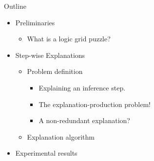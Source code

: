 \documentclass[handout]{beamer}
\begin{document}
\begin{frame}{Outline}

    \begin{itemize}
        \item Preliminaries
              \begin{itemize}
                  \item What is a logic grid puzzle?
              \end{itemize}
        \item Step-wise Explanations
              \begin{itemize}
                  \item Problem definition
                        \begin{itemize}
                            \item Explaining an inference step.
                            \item The explanation-production problem!
                            \item A non-redundant explanation?
                        \end{itemize}
                  \item Explanation algorithm
              \end{itemize}
        \item Experimental results
    \end{itemize}
\end{frame}
\end{document}
